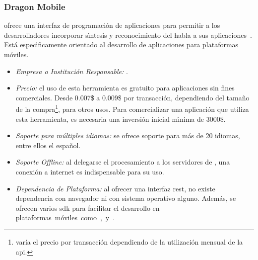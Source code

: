 \subsubsection{Dragon Mobile}
\label{sec:dragonmobile}

 ofrece una interfaz de programaci\'on de aplicaciones para permitir
a los desarrolladores incorporar s{\'\i}ntesis y reconocimiento del habla a sus
\mbox{aplicaciones \cite{DragonMobile}}. Est\'a espec{\'\i}ficamente orientado al desarrollo de
aplicaciones para plataformas m\'oviles.

\begin{itemize}
	\item \emph{Empresa o Instituci\'on Responsable:} .
	\item \emph{Precio:} el uso de esta herramienta es gratuito para aplicaciones sin fines comerciales.
        Desde 0.007\$ a 0.009\$ por transacci\'on, dependiendo del tama\~no de la compra\footnote{ var\'ia el precio
        por transacci\'on dependiendo de la utilizaci\'on mensual de la \gls{api}.}, para otros usos.
	Para comercializar una aplicaci\'on que utiliza esta herramienta, es necesaria una inversi\'on inicial
	m{\'\i}nima de 3000\$.
	\item \emph{Soporte para m\'ultiples idiomas:} se ofrece soporte para m\'as de 20 idiomas, entre ellos
	el espa\~nol.
	\item \emph{Soporte Offline:} al delegarse el procesamiento a los servidores de ,
	una conexi\'on a internet es indispensable para su uso.
	\item \emph{Dependencia de Plataforma:} al ofrecer una interfaz \gls{rest}, no existe dependencia con navegador
	ni con sistema operativo alguno. Adem\'as, se ofrecen varios \gls{sdk} para facilitar
    el desarrollo en \mbox{plataformas m\'oviles como ,  y .}
\end{itemize}